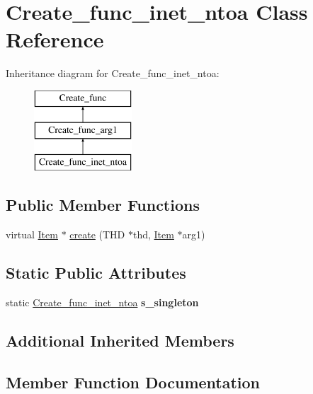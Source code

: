 \hypertarget{classCreate__func__inet__ntoa}{}\section{Create\+\_\+func\+\_\+inet\+\_\+ntoa Class Reference}
\label{classCreate__func__inet__ntoa}
Inheritance diagram for Create\+\_\+func\+\_\+inet\+\_\+ntoa\+:\begin{figure}[H]
\begin{center}
\leavevmode
\includegraphics[height=3.000000cm]{classCreate__func__inet__ntoa}
\end{center}
\end{figure}
\subsection*{Public Member Functions}
\begin{DoxyCompactItemize}
\item 
virtual \mbox{\hyperlink{classItem}{Item}} $\ast$ \mbox{\hyperlink{classCreate__func__inet__ntoa_aafdd4615659d510b89e76142dbb6c1cf}{create}} (T\+HD $\ast$thd, \mbox{\hyperlink{classItem}{Item}} $\ast$arg1)
\end{DoxyCompactItemize}
\subsection*{Static Public Attributes}
\begin{DoxyCompactItemize}
\item 
\mbox{\label{classCreate__func__inet__ntoa_a55062a2926222ea7613d64cd28326d64}} 
static \mbox{\hyperlink{classCreate__func__inet__ntoa}{Create\+\_\+func\+\_\+inet\+\_\+ntoa}} {\bfseries s\+\_\+singleton}
\end{DoxyCompactItemize}
\subsection*{Additional Inherited Members}


\subsection{Member Function Documentation}
\mbox{\label{classCreate__func__inet__ntoa_aafdd4615659d510b89e76142dbb6c1cf}} 

